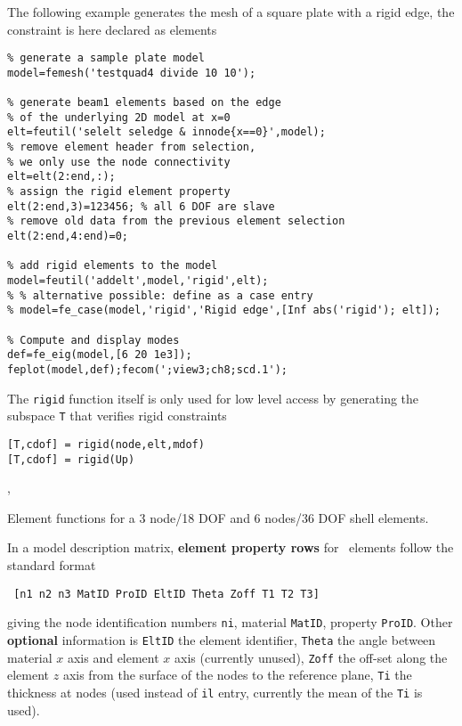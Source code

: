 \vs The following example generates the mesh of a square plate with a rigid edge, the  constraint is here declared as  elements  

\begin{verbatim}
% generate a sample plate model
model=femesh('testquad4 divide 10 10');

% generate beam1 elements based on the edge 
% of the underlying 2D model at x=0
elt=feutil('selelt seledge & innode{x==0}',model);
% remove element header from selection, 
% we only use the node connectivity
elt=elt(2:end,:);
% assign the rigid element property 
elt(2:end,3)=123456; % all 6 DOF are slave
% remove old data from the previous element selection
elt(2:end,4:end)=0; 

% add rigid elements to the model
model=feutil('addelt',model,'rigid',elt);
% % alternative possible: define as a case entry
% model=fe_case(model,'rigid','Rigid edge',[Inf abs('rigid'); elt]); 

% Compute and display modes
def=fe_eig(model,[6 20 1e3]);
feplot(model,def);fecom(';view3;ch8;scd.1');
\end{verbatim}%

\vs 
The {\tt rigid} function itself is only used for low level access by generating the subspace {\tt T} that verifies rigid constraints 

\begin{verbatim}
[T,cdof] = rigid(node,elt,mdof)
[T,cdof] = rigid(Up)
\end{verbatim}


, \celas


Element functions for a 3 node/18 DOF and 6 nodes/36 DOF shell elements.




  In a model description matrix, {\bf element property rows} for \triaa\   elements follow the standard format

\begin{verbatim}
 [n1 n2 n3 MatID ProID EltID Theta Zoff T1 T2 T3] 
\end{verbatim}


\noindent giving the node identification numbers {\tt ni}, material {\tt MatID}, property {\tt ProID}. Other {\bf optional} information is {\tt EltID} the element identifier, {\tt Theta} the angle between material $x$ axis and element $x$ axis (currently unused), {\tt Zoff} the off-set along the element $z$ axis from the surface of the nodes to the reference plane, {\tt Ti} the thickness at nodes (used instead of {\tt il} entry, currently the mean of the {\tt Ti} is used). \par

